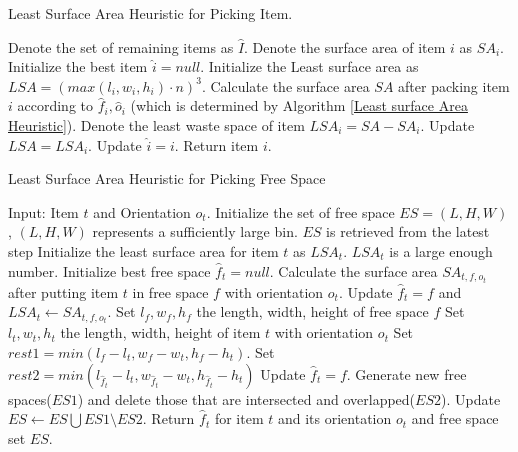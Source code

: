 \documentclass[sigconf]{acmart}
\begin{document}
\begin{algorithm}[!htb]                  %
	\caption{Least Surface Area Heuristic for Picking Item. }       
	\label{Least Waste Space Heuristic} 
	\begin{algorithmic}[1]
		\State Denote the set of remaining items as $\hat{I}$.
		\State Denote the surface area of item $i$ as $SA_i$.
		\State Initialize the best item $\hat{i} =null$. 
		\State Initialize the Least surface area as $LSA= {(max(l_i,w_i,h_i) \cdot n)}^3$.
		\State Calculate the surface area $SA$ after packing item $i$ according to $\hat{f}_{i}, \hat{o}_i$ (which is determined by Algorithm \ref{Least surface Area Heuristic}). 
		\State Denote the least waste space of item $LSA_i = SA-SA_i$.
		\State  Update $LSA = LSA_i $.
		\State  Update $\hat{i} = i$.
		\EndIf
		\EndFor
		\State Return item $i$.
	\end{algorithmic}
\end{algorithm}

\begin{algorithm}[!htb]                 %
	\caption{Least Surface Area Heuristic for Picking Free Space}       
	\label{Least surface Area Heuristic(1)} 
	\begin{algorithmic}[1]
		\State Input: Item $t$ and Orientation $o_t$.
		\State Initialize the set of free space $ES = {(L,H,W)}$, $(L,H,W)$ represents a sufficiently large bin.
		\Else 
		\State $ES$ is retrieved from the latest step
		\EndIf 
		\State Initialize the least surface area for item $t$ as $LSA_t$. $LSA_t$ is a large enough number.
		\State Initialize best free space $\hat{f}_{t} =null$.
		\State Calculate the surface area $SA_{t,f,o_t}$ after putting item $t$ in free space $f$ with orientation $o_t$.
		\State  Update $\hat{f}_{t} =f$ and $LSA_t \leftarrow SA_{t,f,o_t}$.
		\State Set $l_f, w_f, h_f$ the length, width, height of free space $f$ 
		\State Set $l_t, w_t, h_t$ the length, width, height of item $t$ with orientation $o_t$       
		\State  Set $rest1 = min(l_f-l_t, w_f-w_t, h_f-h_t)$. 
		\State  Set $rest2 = min(l_{\hat{f}_{t}}-l_t, w_{\hat{f}_{t}}-w_t, h_{\hat{f}_{t}}-h_t)$ 
		\State Update $\hat{f}_{t} =f$.
		\EndIf	
		\EndIf 
		\EndFor
		\State Generate new free spaces($ES1$) and delete those that are intersected and overlapped($ES2$).
		\State Update $ES  \leftarrow ES  \bigcup ES1  \setminus ES2$.
		\State Return $\hat{f}_{t}$ for item $t$ and its orientation $o_t$ and free space set $ES$.
	\end{algorithmic}
\end{algorithm}







\end{document}
